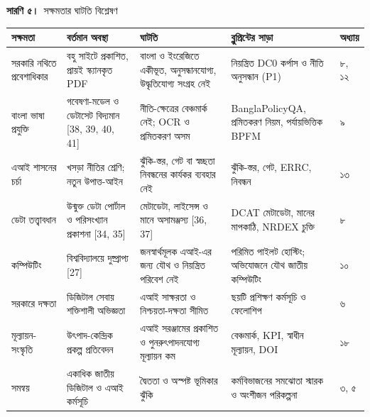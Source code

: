 \documentclass[border=10pt]{standalone}
\begin{document}
\begin{minipage}{17cm}
{\large\bfseries সারণি ৫।}\ {\large সক্ষমতার ঘাটতি বিশ্লেষণ}\par\vspace{7pt}
\small
{}
\begin{tabularx}{\linewidth}{@{}>{\hsize=0.876\hsize\raggedright\arraybackslash}X>{\hsize=1.237\hsize\raggedright\arraybackslash}X>{\hsize=1.237\hsize\raggedright\arraybackslash}X>{\hsize=1.237\hsize\raggedright\arraybackslash}X>{\hsize=0.412\hsize\raggedright\arraybackslash}X@{}}
\arrayrulecolor{bapilrule}\toprule
\rowcolor{white}\textbf{সক্ষমতা} & \textbf{বর্তমান অবস্থা} & \textbf{ঘাটতি} & \textbf{ব্লুপ্রিন্টের সাড়া} & \textbf{অধ্যায়} \\
\midrule
সরকারি নথিতে প্রবেশাধিকার & বহু সাইটে প্রকাশিত, প্রায়ই স্ক্যানকৃত PDF & বাংলা ও ইংরেজিতে একীভূত, অনুসন্ধানযোগ্য, উদ্ধৃতিযোগ্য সংগ্রহ নেই & নিয়ন্ত্রিত DC0 কর্পাস ও নীতি অনুসন্ধান (P1) & ৮, ১২ \\
বাংলা ভাষা প্রযুক্তি & গবেষণা-মডেল ও ডেটাসেট বিদ্যমান [38, 39, 40, 41] & নীতি-ক্ষেত্রের বেঞ্চমার্ক নেই; OCR ও প্রমিতকরণ অসম & BanglaPolicyQA, প্রমিতকরণ নিয়ম, পর্যায়ভিত্তিক BPFM & ৯ \\
এআই শাসনের চর্চা & খসড়া নীতির শ্রেণি; নতুন উপাত্ত-আইন & ঝুঁকি-স্তর, গেট বা স্বচ্ছতা নিবন্ধনের কার্যকর ব্যবহার নেই & ঝুঁকি-স্তর, গেট, ERRC, নিবন্ধন & ১৩ \\
ডেটা তত্ত্বাবধান & উন্মুক্ত ডেটা পোর্টাল ও পরিসংখ্যান প্রকাশনা [34, 35] & মেটাডেটা, লাইসেন্স ও মানে অসামঞ্জস্য [36, 37] & DCAT মেটাডেটা, মানের মাপকাঠি, NRDEX চুক্তি & ৮ \\
কম্পিউটিং & বিশ্ববিদ্যালয়ে দুষ্প্রাপ্য [27] & জনস্বার্থমূলক এআই-এর জন্য যৌথ ও নিয়ন্ত্রিত পরিবেশ নেই & পরিমিত পাইলট হোস্টিং; অভিযোজনে যৌথ জাতীয় কম্পিউটিং & ১০ \\
সরকারে দক্ষতা & ডিজিটাল সেবায় শক্তিশালী অভিজ্ঞতা & এআই সাক্ষরতা ও নিশ্চয়তা-দক্ষতা সীমিত & ছয়টি প্রশিক্ষণ কর্মসূচি ও ফেলোশিপ & ৬ \\
মূল্যায়ন-সংস্কৃতি & উৎপাদ-কেন্দ্রিক প্রকল্প প্রতিবেদন & এআই সরঞ্জামের প্রকাশিত ও পুনরুৎপাদনযোগ্য মূল্যায়ন কম & বেঞ্চমার্ক, KPI, স্বাধীন মূল্যায়ন, DOI & ১৮ \\
সমন্বয় & একাধিক জাতীয় ডিজিটাল ও এআই কর্মসূচি & দ্বৈততা ও অস্পষ্ট ভূমিকার ঝুঁকি & কর্মবিভাজনের সমঝোতা স্মারক ও অংশীজন পরিকল্পনা & ৩, ৫ \\
\bottomrule
\end{tabularx}
\par{}
\end{minipage}
\end{document}
